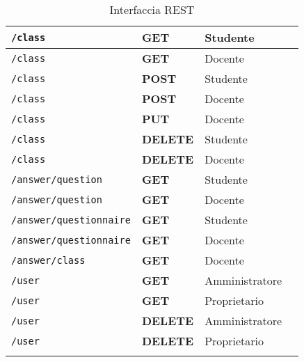 \documentclass[12pt,a4paper]{article}
\begin{document}
\begin{center}
\begin{longtable}[H]{p{} p{} p{} p{}}
		\midrule
		\midrule
		\texttt{/class} & \textbf{GET} & Studente &  \\*
		\midrule
		\texttt{/class} & \textbf{GET} & Docente &  \\*
		\midrule
		\texttt{/class} & \textbf{POST} & Studente &  \\*
		\midrule
		\texttt{/class} & \textbf{POST} & Docente &  \\*
		\midrule
		\texttt{/class} & \textbf{PUT} & Docente &  \\*
		\midrule
		\texttt{/class} & \textbf{DELETE} & Studente &  \\*
		\midrule
		\texttt{/class} & \textbf{DELETE} & Docente &  \\*
		
		\midrule
		\midrule
		\texttt{/answer/question} & \textbf{GET} & Studente &  \\*
		\midrule
		\texttt{/answer/question} & \textbf{GET} & Docente &  \\*
		\midrule
		\texttt{/answer/questionnaire} & \textbf{GET} & Studente &  \\*
		\midrule
		\texttt{/answer/questionnaire} & \textbf{GET} & Docente &  \\*
		\midrule
		\texttt{/answer/class} & \textbf{GET} & Docente &  \\*
		
		\midrule
		\midrule
		\texttt{/user} & \textbf{GET} & Amministratore &  \\*
		\midrule
		\texttt{/user} & \textbf{GET} & Proprietario &  \\*
		\midrule
		\texttt{/user} & \textbf{DELETE} & Amministratore &  \\*
		\midrule
		\texttt{/user} & \textbf{DELETE} & Proprietario &  \\*
		
		\bottomrule
		\caption{Interfaccia REST}
		\label{tab:intrest}
	\end{longtable}
\end{center}
\end{document}
